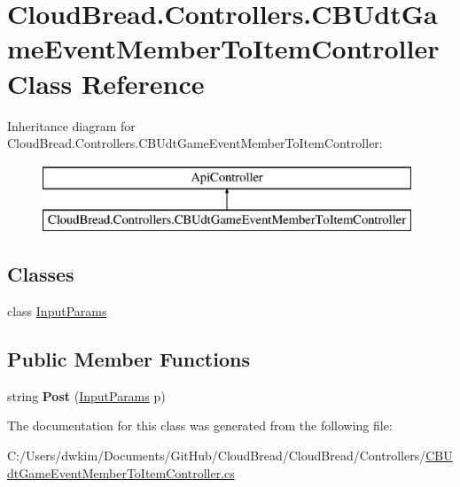 \hypertarget{class_cloud_bread_1_1_controllers_1_1_c_b_udt_game_event_member_to_item_controller}{}\section{Cloud\+Bread.\+Controllers.\+C\+B\+Udt\+Game\+Event\+Member\+To\+Item\+Controller Class Reference}
\label{class_cloud_bread_1_1_controllers_1_1_c_b_udt_game_event_member_to_item_controller}
Inheritance diagram for Cloud\+Bread.\+Controllers.\+C\+B\+Udt\+Game\+Event\+Member\+To\+Item\+Controller\+:\begin{figure}[H]
\begin{center}
\leavevmode
\includegraphics[height=2.000000cm]{class_cloud_bread_1_1_controllers_1_1_c_b_udt_game_event_member_to_item_controller}
\end{center}
\end{figure}
\subsection*{Classes}
\begin{DoxyCompactItemize}
\item 
class \hyperlink{class_cloud_bread_1_1_controllers_1_1_c_b_udt_game_event_member_to_item_controller_1_1_input_params}{Input\+Params}
\end{DoxyCompactItemize}
\subsection*{Public Member Functions}
\begin{DoxyCompactItemize}
\item 
string {\bfseries Post} (\hyperlink{class_cloud_bread_1_1_controllers_1_1_c_b_udt_game_event_member_to_item_controller_1_1_input_params}{Input\+Params} p)\hypertarget{class_cloud_bread_1_1_controllers_1_1_c_b_udt_game_event_member_to_item_controller_a73e753cbb46954f8b32235ccb000f347}{}\label{class_cloud_bread_1_1_controllers_1_1_c_b_udt_game_event_member_to_item_controller_a73e753cbb46954f8b32235ccb000f347}

\end{DoxyCompactItemize}


The documentation for this class was generated from the following file\+:\begin{DoxyCompactItemize}
\item 
C\+:/\+Users/dwkim/\+Documents/\+Git\+Hub/\+Cloud\+Bread/\+Cloud\+Bread/\+Controllers/\hyperlink{_c_b_udt_game_event_member_to_item_controller_8cs}{C\+B\+Udt\+Game\+Event\+Member\+To\+Item\+Controller.\+cs}\end{DoxyCompactItemize}
